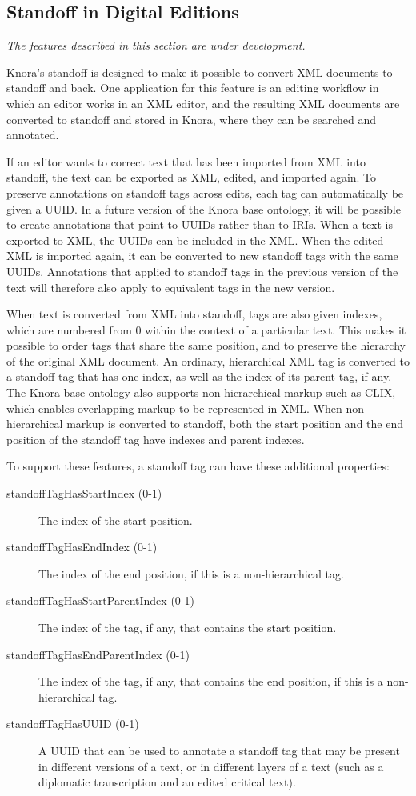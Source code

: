 \documentclass[12pt, a4paper]{article}
\begin{document}
\subsection{Standoff in Digital Editions}

\emph{The features described in this section are under development.}

Knora's standoff is designed to make it possible to convert XML documents to standoff and back. One application for this feature is an editing workflow in which an editor works in an XML editor, and the resulting XML documents are converted to standoff and stored in Knora, where they can be searched and annotated.

If an editor wants to correct text that has been imported from XML into standoff, the text can be exported as XML, edited, and imported again. To preserve annotations on standoff tags across edits, each tag can automatically be given a UUID. In a future version of the Knora base ontology, it will be possible to create annotations that point to UUIDs rather than to IRIs. When a text is exported to XML, the UUIDs can be included in the XML. When the edited XML is imported again, it can be converted to new standoff tags with the same UUIDs. Annotations that applied to standoff tags in the previous version of the text will therefore also apply to equivalent tags in the new version.

When text is converted from XML into standoff, tags are also given indexes, which are numbered from 0 within the context of a particular text. This makes it possible to order tags that share the same position, and to preserve the hierarchy of the original XML document. An ordinary, hierarchical XML tag is converted to a standoff tag that has one index, as well as the index of its parent tag, if any. The Knora base ontology also supports non-hierarchical markup such as CLIX\cite{CLIX}, which enables overlapping markup to be represented in XML. When non-hierarchical markup is converted to standoff, both the start position and the end position of the standoff tag have indexes and parent indexes.

To support these features, a standoff tag can have these additional properties:

\begin{description}
	\item[standoffTagHasStartIndex (0-1)] The index of the start position.
	\item[standoffTagHasEndIndex (0-1)] The index of the end position, if this is a non-hierarchical tag.
	\item[standoffTagHasStartParentIndex (0-1)] The index of the tag, if any, that contains the start position.
	\item[standoffTagHasEndParentIndex (0-1)] The index of the tag, if any, that contains the end position, if this is a non-hierarchical tag.
	\item[standoffTagHasUUID (0-1)] A UUID that can be used to annotate a standoff tag that may be present in different versions of a text, or in different layers of a text (such as a diplomatic transcription and an edited critical text).
\end{description}
\end{document}
